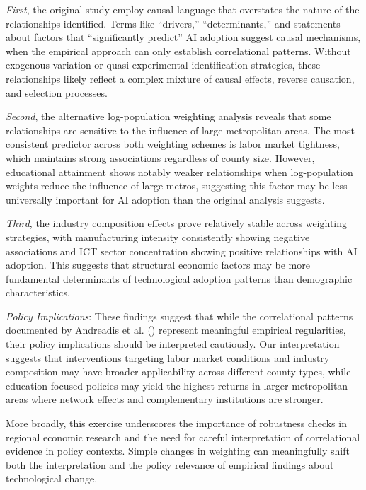 \documentclass[
]{article}
\begin{document}
\emph{First}, the original study employ causal language that overstates
the nature of the relationships identified. Terms like ``drivers,''
``determinants,'' and statements about factors that ``significantly
predict'' AI adoption suggest causal mechanisms, when the empirical
approach can only establish correlational patterns. Without exogenous
variation or quasi-experimental identification strategies, these
relationships likely reflect a complex mixture of causal effects,
reverse causation, and selection processes.

\emph{Second}, the alternative log-population weighting analysis reveals
that some relationships are sensitive to the influence of large
metropolitan areas. The most consistent predictor across both weighting
schemes is labor market tightness, which maintains strong associations
regardless of county size. However, educational attainment shows notably
weaker relationships when log-population weights reduce the influence of
large metros, suggesting this factor may be less universally important
for AI adoption than the original analysis suggests.

\emph{Third}, the industry composition effects prove relatively stable
across weighting strategies, with manufacturing intensity consistently
showing negative associations and ICT sector concentration showing
positive relationships with AI adoption. This suggests that structural
economic factors may be more fundamental determinants of technological
adoption patterns than demographic characteristics.

\emph{Policy Implications}: These findings suggest that while the
correlational patterns documented by Andreadis et al.
() represent meaningful empirical
regularities, their policy implications should be interpreted
cautiously. Our interpretation suggests that interventions targeting
labor market conditions and industry composition may have broader
applicability across different county types, while education-focused
policies may yield the highest returns in larger metropolitan areas
where network effects and complementary institutions are stronger.

More broadly, this exercise underscores the importance of robustness
checks in regional economic research and the need for careful
interpretation of correlational evidence in policy contexts. Simple
changes in weighting can meaningfully shift both the interpretation and
the policy relevance of empirical findings about technological change.
\end{document}
